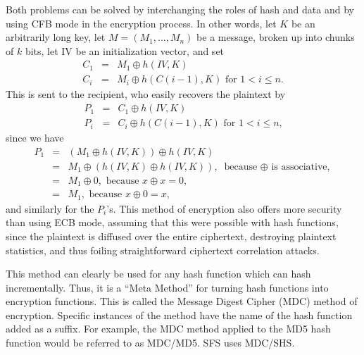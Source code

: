 Both problems can be solved by interchanging the roles of hash and data and by
using CFB mode in the encryption process.  In other words, let $K$ be an
arbitrarily long key, let $M = ( M_1, ..., M_n )$ be a message, broken up into 
chunks of $k$ bits, let IV be an initialization vector, and set
\begin{eqnarray*}
  C_1 & = & M_1 \oplus h( IV, K )\\
  C_i & = & M_i \oplus h( C( i-1 ), K )        \mbox{ for $1 < i \leq n$.}
\end{eqnarray*}
This is sent to the recipient, who easily recovers the plaintext by
\begin{eqnarray*}
  P_1 & = & C_1 \oplus h( IV, K )\\
  P_i & = & C_i \oplus h( C( i-1 ), K )        \mbox{ for $1 < i \leq n$,}
\end{eqnarray*}
since we have
\begin{eqnarray*}
    P_1 & = & ( M_1 \oplus h( IV, K ) ) \oplus h( IV, K )\\
        & = & M_1 \oplus ( h( IV, K ) \oplus h( IV,K ) ),\mbox{ because $\oplus$ is associative,}\\
        & = & M_1 \oplus 0,                              \mbox{ because $x \oplus x = 0$,}\\
        & = & M_1,                                       \mbox{ because $x \oplus 0 = x$,}
\end{eqnarray*}
and similarly for the $P_i$'s.  This method of encryption also offers more
security than using ECB mode, assuming that this were possible with hash
functions, since the plaintext is diffused over the entire ciphertext,
destroying plaintext statistics, and thus foiling straightforward ciphertext
correlation attacks.

This method can clearly be used for any hash function which can hash
incrementally.  Thus, it is a ``Meta Method'' for turning hash functions into
encryption functions.  This is called the Message Digest Cipher (MDC) method of
encryption.  Specific instances of the method have the name of the hash
function added as a suffix.  For example, the MDC method applied to the MD5
hash function would be referred to as MDC/MD5.  SFS uses MDC/SHS.

